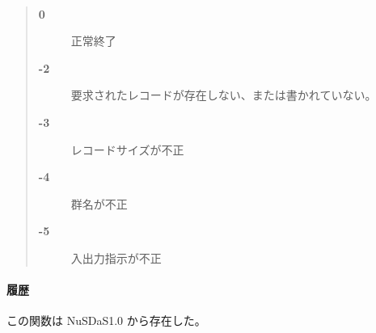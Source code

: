 \paragraph{\ResultCode}
\begin{quote}
\begin{description}
\item[{\bf 0}] 正常終了
\item[{\bf -2}] 要求されたレコードが存在しない、または書かれていない。
\item[{\bf -3}] レコードサイズが不正
\item[{\bf -4}] 群名が不正
\item[{\bf -5}] 入出力指示が不正
\end{description}\end{quote}
\paragraph{ 履歴 }
この関数は NuSDaS1.0 から存在した。
